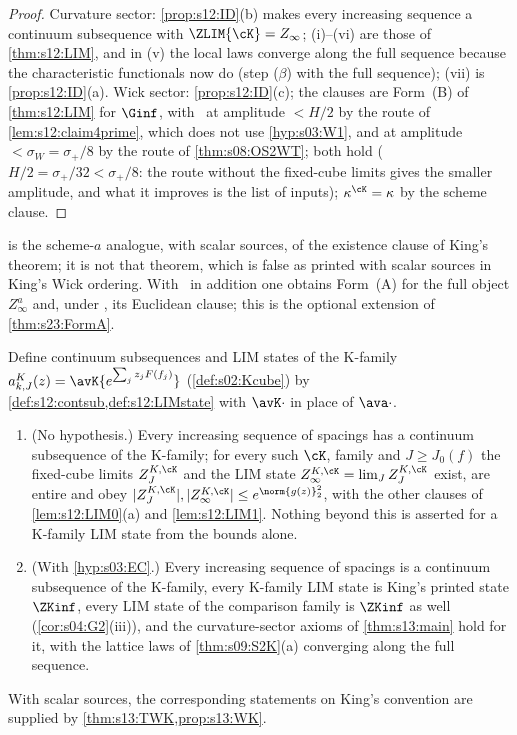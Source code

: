 \begin{proof}
Curvature sector: \cref{prop:s12:ID}(b) makes every increasing sequence a continuum subsequence with $\ZLIM{\cK}=Z_\infty$; (i)--(vi) are those of \cref{thm:s12:LIM}, and in (v) the local laws converge along the full sequence because the characteristic functionals now do (step ($\beta$) with the full sequence); (vii) is \cref{prop:s12:ID}(a). Wick sector: \cref{prop:s12:ID}(c); the clauses are Form~(B) of \cref{thm:s12:LIM} for $\Ginf$, with \OSt\ at amplitude $<H/2$ by the route of \cref{lem:s12:claim4prime}, which does not use \cref{hyp:s03:W1}, and at amplitude $<\sigma_W=\sigma_+/8$ by the route of \cref{thm:s08:OS2WT}; both hold ($H/2=\sigma_+/32<\sigma_+/8$: the route without the fixed-cube limits gives the smaller amplitude, and what it improves is the list of inputs); $\kappa^{\cK}=\kappa$ by the scheme clause.
\end{proof}

 is the scheme-$a$ analogue, with scalar sources, of the existence clause of King's theorem; it is not that theorem, which is false as printed with scalar sources in King's Wick ordering. With \Wtwo\ in addition one obtains Form~(A) for the full object $Z^a_\infty$ and, under \RW, its Euclidean clause; this is the optional extension of \cref{thm:s23:FormA}.

\begin{corollary}\label{cor:s12:KK}
Define continuum subsequences and LIM states of the K-family $a^K_{k,J}(z)=\avK{e^{\sum_jz_jF(f_j)}}$ (\cref{def:s02:Kcube}) by \cref{def:s12:contsub,def:s12:LIMstate} with $\avK\cdot$ in place of $\ava\cdot$.
\begin{enumerate}[label=\textup{(\alph*)},leftmargin=*,nosep]
\item \textup{(No hypothesis.)} Every increasing sequence of spacings has a continuum subsequence of the K-family; for every such $\cK$, family and $J\ge J_0(f)$ the fixed-cube limits $Z^{K,\cK}_J$ and the LIM state $Z^{K,\cK}_\infty=\lim_JZ^{K,\cK}_J$ exist, are entire and obey $|Z^{K,\cK}_J|,|Z^{K,\cK}_\infty|\le e^{\norm{g(z)}_2^2}$, with the other clauses of \cref{lem:s12:LIM0}(a) and \cref{lem:s12:LIM1}. Nothing beyond this is asserted for a K-family LIM state from the bounds alone.
\item \textup{(With \cref{hyp:s03:EC}.)} Every increasing sequence of spacings is a continuum subsequence of the K-family, every K-family LIM state is King's printed state $\ZKinf$, every LIM state of the comparison family is $\ZKinf$ as well (\cref{cor:s04:G2}(iii)), and the curvature-sector axioms of \cref{thm:s13:main} hold for it, with the lattice laws of \cref{thm:s09:S2K}(a) converging along the full sequence.
\end{enumerate}
With scalar sources, the corresponding statements on King's convention are supplied by \cref{thm:s13:TWK,prop:s13:WK}.
\end{corollary}

